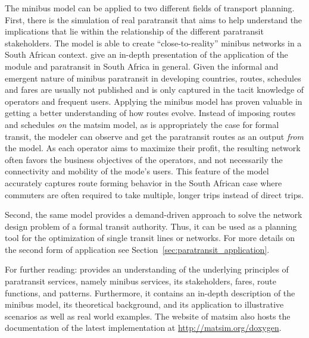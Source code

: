 The minibus model can be applied to two different fields of transport planning. First, there is the simulation of real paratransit that aims to help understand the implications that lie within the relationship of the different paratransit stakeholders. The model is able to create ``close-to-reality'' minibus networks in a South African context. \citet[][]{NeumannEtAl2014MinibusRSA} give an in-depth presentation of the application of the module and paratransit in South Africa in general. Given the informal and emergent nature of minibus paratransit in developing countries, routes, schedules and fares are usually not published and is only captured in the tacit knowledge of operators and frequent users. Applying the minibus model has proven valuable in getting a better understanding of how routes evolve. Instead of imposing routes and schedules \emph{on} the \gls{matsim} model, as is appropriately the case for formal transit, the modeler can observe and get the paratransit routes as an output \emph{from} the model. As each operator aims to maximize their profit, the resulting network often favors the business objectives of the operators, and not necessarily the connectivity and mobility of the mode's users. This feature of the model accurately captures route forming behavior in the South African case where commuters are often required to take multiple, longer trips instead of direct trips.

Second, the same model provides a demand-driven approach to solve the network design problem of a formal transit authority. Thus, it can be used as a planning tool for the optimization of single transit lines or networks. For more details on the second form of application see Section~\ref{sec:paratransit_application}.

For further reading: \citet[][]{Neumann_PhDThesis_2014} provides an understanding of the underlying principles of paratransit services, namely minibus services, its stakeholders, fares, route functions, and patterns. Furthermore, it contains an in-depth description of the minibus model, its theoretical background, and its application to illustrative scenarios as well as real world examples. The website of \gls{matsim} also hosts the documentation of the latest implementation at \url{http://matsim.org/doxygen}.

